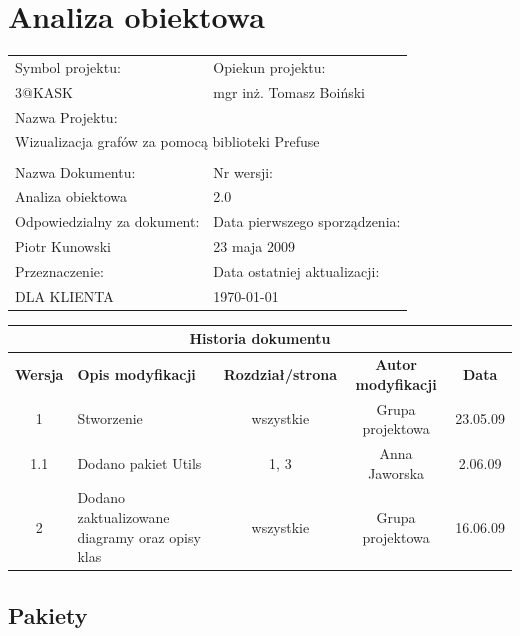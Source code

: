 
\section{Analiza obiektowa}





\begin{center}
\begin{longtable}{|p{7cm}|p{7cm}|}
\hline
Symbol projektu: & Opiekun projektu:   \tabularnewline 
3@KASK & mgr inż. Tomasz Boiński    \tabularnewline \hline
\multicolumn{2}{|l|}{Nazwa Projektu: } \tabularnewline
\multicolumn{2}{|l|}{Wizualizacja grafów za pomocą biblioteki Prefuse } \tabularnewline 
\hline
\multicolumn{2}{l}{ } \tabularnewline %
\hline 
Nazwa Dokumentu: & Nr wersji:   \tabularnewline 
Analiza obiektowa & 2.0 \tabularnewline \hline
Odpowiedzialny za dokument: & Data pierwszego sporządzenia:   \tabularnewline 
Piotr Kunowski & 23 maja 2009 \tabularnewline \hline
Przeznaczenie: & Data ostatniej aktualizacji:   \tabularnewline 
DLA KLIENTA & \today \tabularnewline \hline
\end{longtable}
\end{center}


\begin{center}
\begin{longtable}{|c|p{4cm}|c|c|c|}
\multicolumn{5}{c}{\textbf{Historia dokumentu}} \tabularnewline \hline
\textbf{Wersja} & \textbf{Opis modyfikacji} & \textbf{Rozdział/strona} & \textbf{Autor modyfikacji} & \textbf{Data} \tabularnewline \hline 
1 & Stworzenie & wszystkie & Grupa projektowa & 23.05.09 \tabularnewline \hline
1.1 & Dodano pakiet Utils & 1, 3 & Anna Jaworska & 2.06.09 \tabularnewline \hline
2 & Dodano zaktualizowane diagramy oraz opisy klas & wszystkie & Grupa projektowa & 16.06.09 \tabularnewline \hline

\end{longtable}
\end{center}




\subsection{Pakiety}

